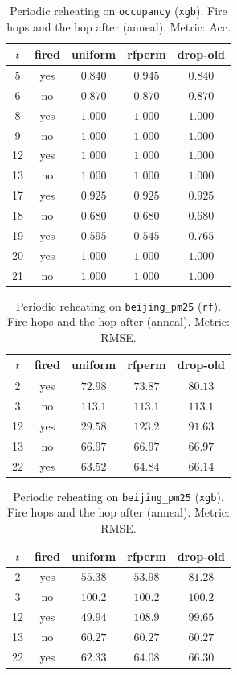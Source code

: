 \begin{table}[ht]\centering
\caption{Periodic reheating on \texttt{occupancy} (\texttt{xgb}).
Fire hops and the hop after (anneal). Metric: Acc.}
\label{tab:po-refit-periodic-occupancy-xgb}
\small
\begin{tabular}{@{}ccccc@{}}\toprule
$t$ & fired & uniform & rfperm & drop-old \\
\midrule
5 & yes & $0.840$ & $0.945$ & $0.840$ \\
6 & no & $0.870$ & $0.870$ & $0.870$ \\
8 & yes & $1.000$ & $1.000$ & $1.000$ \\
9 & no & $1.000$ & $1.000$ & $1.000$ \\
12 & yes & $1.000$ & $1.000$ & $1.000$ \\
13 & no & $1.000$ & $1.000$ & $1.000$ \\
17 & yes & $0.925$ & $0.925$ & $0.925$ \\
18 & no & $0.680$ & $0.680$ & $0.680$ \\
19 & yes & $0.595$ & $0.545$ & $0.765$ \\
20 & yes & $1.000$ & $1.000$ & $1.000$ \\
21 & no & $1.000$ & $1.000$ & $1.000$ \\
\bottomrule
\end{tabular}
\end{table}

\begin{table}[ht]\centering
\caption{Periodic reheating on \texttt{beijing\_pm25} (\texttt{rf}).
Fire hops and the hop after (anneal). Metric: RMSE.}
\label{tab:po-refit-periodic-beijing-pm25-rf}
\small
\begin{tabular}{@{}ccccc@{}}\toprule
$t$ & fired & uniform & rfperm & drop-old \\
\midrule
2 & yes & $72.98$ & $73.87$ & $80.13$ \\
3 & no & $113.1$ & $113.1$ & $113.1$ \\
12 & yes & $29.58$ & $123.2$ & $91.63$ \\
13 & no & $66.97$ & $66.97$ & $66.97$ \\
22 & yes & $63.52$ & $64.84$ & $66.14$ \\
\bottomrule
\end{tabular}
\end{table}

\begin{table}[ht]\centering
\caption{Periodic reheating on \texttt{beijing\_pm25} (\texttt{xgb}).
Fire hops and the hop after (anneal). Metric: RMSE.}
\label{tab:po-refit-periodic-beijing-pm25-xgb}
\small
\begin{tabular}{@{}ccccc@{}}\toprule
$t$ & fired & uniform & rfperm & drop-old \\
\midrule
2 & yes & $55.38$ & $53.98$ & $81.28$ \\
3 & no & $100.2$ & $100.2$ & $100.2$ \\
12 & yes & $49.94$ & $108.9$ & $99.65$ \\
13 & no & $60.27$ & $60.27$ & $60.27$ \\
22 & yes & $62.33$ & $64.08$ & $66.30$ \\
\bottomrule
\end{tabular}
\end{table}
